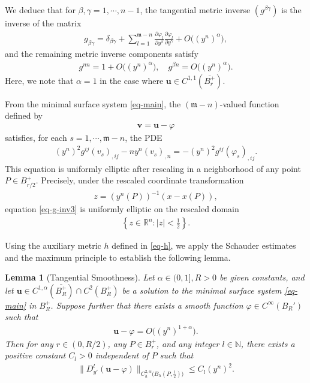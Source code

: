 \documentclass[11pt,reqno]{amsart}
\newcommand{\fm}{\mathfrak{m}}
\renewcommand{\leq}{\leqslant}
\newtheorem{lemma}[theorem]{Lemma}
\theoremstyle{definition}
\numberwithin{equation}{section}
\begin{document}
We deduce that for $\beta,\gamma=1,\cdots, n-1$, the tangential metric inverse $(g^{\beta\gamma})$ is the inverse of the matrix
\begin{align}\label{eq-g-inv1}
g_{\beta\gamma}=\delta_{\beta\gamma} +\sum_{l=1}^{\fm -n} \frac{\partial \varphi_l}{\partial y^\beta}\frac{\partial \varphi_l}{\partial y^\gamma} +O\bigl((y^n)^\alpha\bigr),
\end{align}
and the remaining metric inverse components satisfy
\begin{align}\label{eq-g-inv11}
    g^{nn} = 1+O\bigl((y^n)^\alpha\bigr),\quad g^{\beta n} = O\bigl((y^n)^\alpha\bigr).
\end{align}
Here, we note that $\alpha=1$ in the case where $\mathbf{u} \in C^{1,1}(\overline{B^+_r})$.

From the minimal surface system \eqref{eq-main}, the $(\fm-n)$-valued function defined by
\begin{align}
    \mathbf{v} =\mathbf{u} -\varphi
\end{align}
satisfies, for each $s=1,\cdots, \fm -n$, the PDE
\begin{align}\label{eq-g-inv3}
    (y^n)^2 g^{ij}(v_{s})_{,ij} - n y^n(v_s)_{,n} = -(y^n)^2 g^{ij}(\varphi_{s})_{,ij}.
\end{align}
This equation is uniformly elliptic after rescaling in a neighborhood of any point $P \in B^+_{r/2}$. Precisely, under the rescaled coordinate transformation
\begin{align}\label{eq-z}
    z = (y^n(P))^{-1}(x - x(P)),
\end{align}
equation \eqref{eq-g-inv3} is uniformly elliptic on the rescaled domain
\begin{align}
    \left\{z\in\mathbb{R}^n: |z|<\frac{1}{2}\right\}.
\end{align}

Using the auxiliary metric $h$ defined in \eqref{eq-h}, we apply the Schauder estimates and the maximum principle to establish the following lemma.
\begin{lemma}[Tangential Smoothness]\label{lem-tan-smooth}
    Let $\alpha\in (0,1], R>0$ be given constants, and let $\mathbf{u} \in C^{1,\alpha}(\overline{B^+_R})\cap C^2(B^+_R)$ be a solution to the minimal surface system \eqref{eq-main} in $B^+_R$. Suppose further that there exists a smooth function $\varphi \in C^{\infty}(B_R')$ such that
    \begin{align}\label{eq-varphi-1+alpha}
        \mathbf{u} -\varphi = O\bigl((y^n)^{1+\alpha}\bigr).
    \end{align}
    Then for any $r\in (0, R/2)$, any $P\in B_{r}^+$, and any integer $l\in \mathbb N$, there exists a positive constant $C_l>0$ independent of $P$ such that
    \begin{align}\label{eq-tang-smooth}
        \|D_{y'}^l (\mathbf{u} -\varphi)\|_{C^{2, \alpha}_h\bigl(B_h(P, \tfrac{1}{2})\bigr)}\leq C_l(y^n)^{2}.
    \end{align}
\end{lemma}
\end{document}

